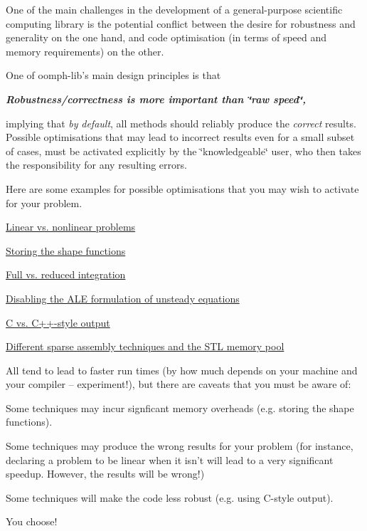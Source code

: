 One of the main challenges in the development of a general-\/purpose scientific computing library is the potential conflict between the desire for robustness and generality on the one hand, and code optimisation (in terms of speed and memory requirements) on the other.

One of {\ttfamily oomph-\/lib's} main design principles is that

\begin{center} {\itshape {\bfseries Robustness/correctness is more important than \char`\"{}raw speed\char`\"{},}} \end{center} 

implying that {\itshape by} {\itshape default}, all methods should reliably produce the {\itshape correct} results. Possible optimisations that may lead to incorrect results even for a small subset of cases, must be activated explicitly by the \char`\"{}knowledgeable\char`\"{} user, who then takes the responsibility for any resulting errors.

Here are some examples for possible optimisations that you may wish to activate for your problem.
\begin{DoxyItemize}
\item \hyperlink{index_linear_vs_nonlinear}{Linear vs. nonlinear problems}
\item \hyperlink{index_store_shape}{Storing the shape functions}
\item \hyperlink{index_full_integration}{Full vs. reduced integration}
\item \hyperlink{index_ale}{Disabling the A\-L\-E formulation of unsteady equations}
\item \hyperlink{index_C_style_output}{C vs. C++-\/style output}
\item \hyperlink{index_assembly}{Different sparse assembly techniques and the S\-T\-L memory pool}
\end{DoxyItemize}All tend to lead to faster run times (by how much depends on your machine and your compiler -- experiment!), but there are caveats that you must be aware of\-:
\begin{DoxyItemize}
\item Some techniques may incur signficant memory overheads (e.\-g. storing the shape functions).
\item Some techniques may produce the wrong results for your problem (for instance, declaring a problem to be linear when it isn't will lead to a very significant speedup. However, the results will be wrong!)
\item Some techniques will make the code less robust (e.\-g. using C-\/style output).
\end{DoxyItemize}You choose!



